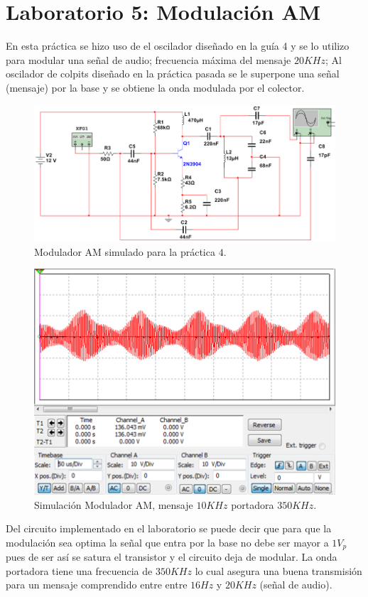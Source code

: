 \documentclass[11pt,graphicx,caption,rotating]{article}
\begin{document}
\section{Laboratorio 5: Modulación AM}
\noindent
En esta práctica se hizo uso de el oscilador diseñado en la guía 4 y se lo utilizo para modular una señal de audio; frecuencia máxima del mensaje $20 KHz$; Al oscilador de colpits diseñado en la práctica pasada se le superpone una señal (mensaje) por la base y se obtiene la onda modulada por el colector.
\begin{figure}[H]
	\centering
		\includegraphics[scale=0.5]{circuit_lab_5.png}
	\caption{Modulador AM simulado para la práctica $4$.}
	\label{fig16}
\end{figure}
\begin{figure}[H]
	\centering
		\includegraphics[scale=0.35]{simulation_lab_5.png}
	\caption{Simulación Modulador AM, mensaje $10KHz$ portadora $350 KHz$.}
	\label{fig17}
\end{figure}
\noindent
Del circuito implementado en el laboratorio se puede decir que para que la modulación sea optima la señal que entra por la base no debe ser mayor a $1 V_p$  pues de ser así se satura el transistor y el circuito deja de modular. La onda portadora tiene una frecuencia de $350 KHz$ lo cual asegura una buena transmisión para un mensaje comprendido entre  entre $16 Hz$ y $20 KHz$ (señal de audio).
\end{document}

